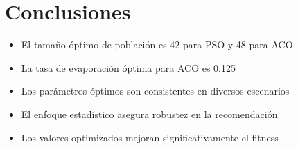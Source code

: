 \documentclass{article}
\begin{document}
\section{Conclusiones}
\begin{itemize}
    \item El tamaño óptimo de población es 42 para PSO y 48 para ACO
    \item La tasa de evaporación óptima para ACO es 0.125
    \item Los parámetros óptimos son consistentes en diversos escenarios
    \item El enfoque estadístico asegura robustez en la recomendación
    \item Los valores optimizados mejoran significativamente el fitness
\end{itemize}
\end{document}
